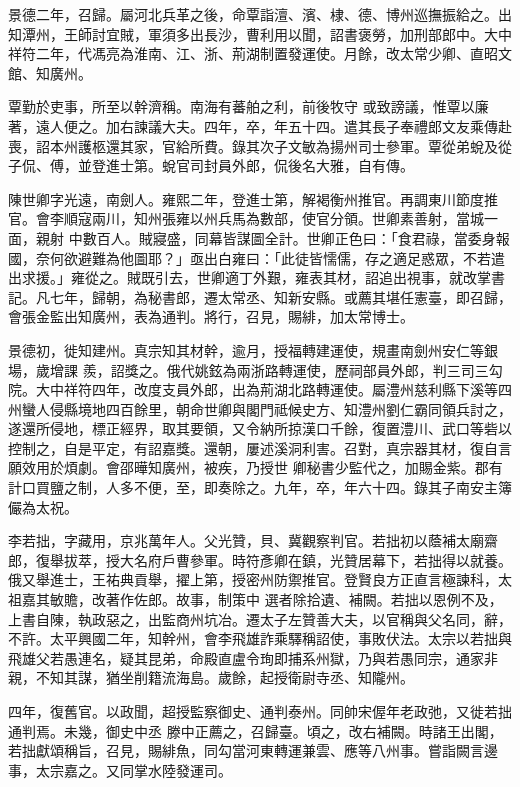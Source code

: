 \begin{pinyinscope}
 景德二年，召歸。屬河北兵革之後，命覃詣澶、濱、棣、德、博州巡撫振給之。出知潭州，王師討宜賊，軍須多出長沙，曹利用以聞，詔書褒勞，加刑部郎中。大中祥符二年，代馮亮為淮南、江、浙、荊湖制置發運使。月餘，改太常少卿、直昭文館、知廣州。



 覃勤於吏事，所至以幹濟稱。南海有蕃舶之利，前後牧守
 或致謗議，惟覃以廉著，遠人便之。加右諫議大夫。四年，卒，年五十四。遣其長子奉禮郎文友乘傳赴喪，詔本州護柩還其家，官給所費。錄其次子文敏為揚州司士參軍。覃從弟蛻及從子侃、傅，並登進士第。蛻官司封員外郎，侃後名大雅，自有傳。



 陳世卿字光遠，南劍人。雍熙二年，登進士第，解褐衡州推官。再調東川節度推官。會李順寇兩川，知州張雍以州兵馬為數部，使官分領。世卿素善射，當城一面，親射
 中數百人。賊寢盛，同幕皆謀圖全計。世卿正色曰：「食君祿，當委身報國，奈何欲避難為他圖耶？」亟出白雍曰：「此徒皆懦儒，存之適足惑眾，不若遣出求援。」雍從之。賊既引去，世卿適丁外艱，雍表其材，詔追出視事，就改掌書記。凡七年，歸朝，為秘書郎，遷太常丞、知新安縣。或薦其堪任憲臺，即召歸，會張金監出知廣州，表為通判。將行，召見，賜緋，加太常博士。



 景德初，徙知建州。真宗知其材幹，逾月，授福轉建運使，規畫南劍州安仁等銀場，歲增課
 羨，詔獎之。俄代姚鉉為兩浙路轉運使，歷祠部員外郎，判三司三勾院。大中祥符四年，改度支員外郎，出為荊湖北路轉運使。屬澧州慈利縣下溪等四州蠻人侵縣境地四百餘里，朝命世卿與閣門祗候史方、知澧州劉仁霸同領兵討之，遂還所侵地，標正經界，取其要領，又令納所掠漢口千餘，復置澧川、武口等砦以控制之，自是平定，有詔嘉獎。還朝，屢述溪洞利害。召對，真宗器其材，復自言願效用於煩劇。會邵曄知廣州，被疾，乃授世
 卿秘書少監代之，加賜金紫。郡有計口買鹽之制，人多不便，至，即奏除之。九年，卒，年六十四。錄其子南安主簿儼為太祝。



 李若拙，字藏用，京兆萬年人。父光贊，貝、冀觀察判官。若拙初以蔭補太廟齋郎，復舉拔萃，授大名府戶曹參軍。時符彥卿在鎮，光贊居幕下，若拙得以就養。俄又舉進士，王祐典貢舉，擢上第，授密州防禦推官。登賢良方正直言極諫科，太祖嘉其敏贍，改著作佐郎。故事，制策中
 選者除拾遺、補闕。若拙以恩例不及，上書自陳，執政惡之，出監商州坑冶。遷太子左贊善大夫，以官稱與父名同，辭，不許。太平興國二年，知幹州，會李飛雄詐乘驛稱詔使，事敗伏法。太宗以若拙與飛雄父若愚連名，疑其昆弟，命殿直盧令珣即捕系州獄，乃與若愚同宗，通家非親，不知其謀，猶坐削籍流海島。歲餘，起授衛尉寺丞、知隴州。



 四年，復舊官。以政聞，超授監察御史、通判泰州。同帥宋偓年老政弛，又徙若拙通判焉。未幾，御史中丞
 滕中正薦之，召歸臺。頃之，改右補闕。時諸王出閣，若拙獻頌稱旨，召見，賜緋魚，同勾當河東轉運兼雲、應等八州事。嘗詣闕言邊事，太宗嘉之。又同掌水陸發運司。




\end{pinyinscope}
